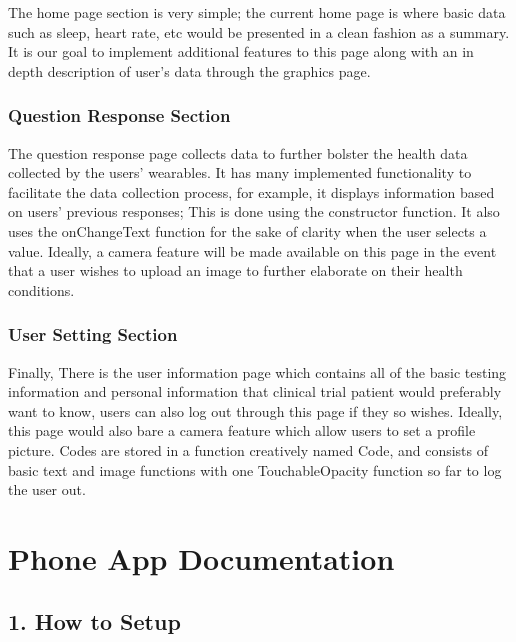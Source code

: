 \documentclass[]{book}
\begin{document}
The home page section is very simple; the current home page is where basic data such as sleep, heart rate, etc would be presented in a clean fashion as a summary. It is our goal to implement additional features to this page along with an in depth description of user's data through the graphics page.

\hypertarget{question-response-section}{%
\subsection{Question Response Section}\label{question-response-section}}

The question response page collects data to further bolster the health data collected by the users' wearables. It has many implemented functionality to facilitate the data collection process, for example, it displays information based on users' previous responses; This is done using the constructor function. It also uses the onChangeText function for the sake of clarity when the user selects a value. Ideally, a camera feature will be made available on this page in the event that a user wishes to upload an image to further elaborate on their health conditions.

\hypertarget{user-setting-section}{%
\subsection{User Setting Section}\label{user-setting-section}}

Finally, There is the user information page which contains all of the basic testing information and personal information that clinical trial patient would preferably want to know, users can also log out through this page if they so wishes. Ideally, this page would also bare a camera feature which allow users to set a profile picture. Codes are stored in a function creatively named Code, and consists of basic text and image functions with one TouchableOpacity function so far to log the user out.

\hypertarget{phone-app-documentation}{%
\chapter{Phone App Documentation}\label{phone-app-documentation}}

\hypertarget{how-to-setup}{%
\section{1. How to Setup}\label{how-to-setup}}
\end{document}
